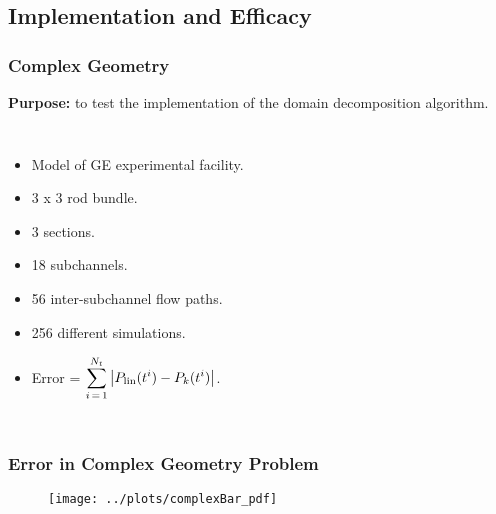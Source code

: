 \documentclass[compress,xcolor=table]{beamer}
\begin{document}
\subsection[Implementation \& Efficacy]{Implementation and Efficacy}
\begin{frame}
\frametitle{Complex Geometry}

\textbf{Purpose:} to test the implementation of the domain decomposition algorithm.

\begin{columns}

\begin{itemize}
\item{Model of GE experimental facility.}
\item{3 x 3 rod bundle.}
\item{3 sections.}
\item{18 subchannels.}
\item{56 inter-subchannel flow paths.}
\item{256 different simulations.}
\item{Error = $\displaystyle \sum_{i\,=\,1}^{N_{t}} \left|P_{\text{lin}}(t^{i}) -P_{k}(t^{i})\right|$.}
\end{itemize}


\begin{figure}[h!t]
\centering
\resizebox{\textwidth}{!}{

}
\end{figure}

\end{columns}
\end{frame}
\begin{frame}
\frametitle{Error in Complex Geometry Problem}

\begin{figure}[h!t]
\centering
\texttt{[image: ../plots/complexBar\_pdf]}
\end{figure}

\end{frame}
\end{document}
